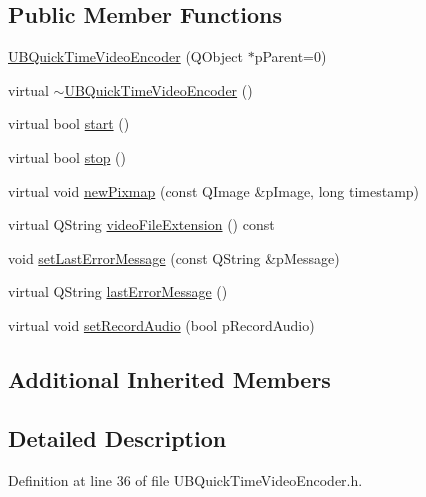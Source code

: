 \subsection*{Public Member Functions}
\begin{DoxyCompactItemize}
\item 
\hyperlink{class_u_b_quick_time_video_encoder_a71c396babd0236d26a09705e34b13099}{U\-B\-Quick\-Time\-Video\-Encoder} (Q\-Object $\ast$p\-Parent=0)
\item 
virtual \hyperlink{class_u_b_quick_time_video_encoder_a2fbd40d3da7fb2b3a098e16275018118}{$\sim$\-U\-B\-Quick\-Time\-Video\-Encoder} ()
\item 
virtual bool \hyperlink{class_u_b_quick_time_video_encoder_a0c595b139425a5d9e0d535807946bf68}{start} ()
\item 
virtual bool \hyperlink{class_u_b_quick_time_video_encoder_aa0151d5ee1872cf9fa863dac08f927b2}{stop} ()
\item 
virtual void \hyperlink{class_u_b_quick_time_video_encoder_a119172562e5b7c49f920faba76e12563}{new\-Pixmap} (const Q\-Image \&p\-Image, long timestamp)
\item 
virtual Q\-String \hyperlink{class_u_b_quick_time_video_encoder_a8f2892b2c077bc52f0c82dc112795c15}{video\-File\-Extension} () const 
\item 
void \hyperlink{class_u_b_quick_time_video_encoder_a49e2eaf7d2a7d40d9016dbde8f7fc105}{set\-Last\-Error\-Message} (const Q\-String \&p\-Message)
\item 
virtual Q\-String \hyperlink{class_u_b_quick_time_video_encoder_a20cf47e6a5eda4d29d1878f0822f58bd}{last\-Error\-Message} ()
\item 
virtual void \hyperlink{class_u_b_quick_time_video_encoder_ae3c9201f5d14e49801b06e77f9fdaf01}{set\-Record\-Audio} (bool p\-Record\-Audio)
\end{DoxyCompactItemize}
\subsection*{Additional Inherited Members}


\subsection{Detailed Description}


Definition at line 36 of file U\-B\-Quick\-Time\-Video\-Encoder.\-h.




